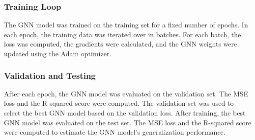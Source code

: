 \documentclass[twocolumn]{aastex631}
\begin{document}
\subsubsection{Training Loop}
The GNN model was trained on the training set for a fixed number of epochs. In each epoch, the training data was iterated over in batches. For each batch, the loss was computed, the gradients were calculated, and the GNN weights were updated using the Adam optimizer.

\subsubsection{Validation and Testing}
After each epoch, the GNN model was evaluated on the validation set. The MSE loss and the R-squared score were computed. The validation set was used to select the best GNN model based on the validation loss. After training, the best GNN model was evaluated on the test set. The MSE loss and the R-squared score were computed to estimate the GNN model's generalization performance.
\end{document}

